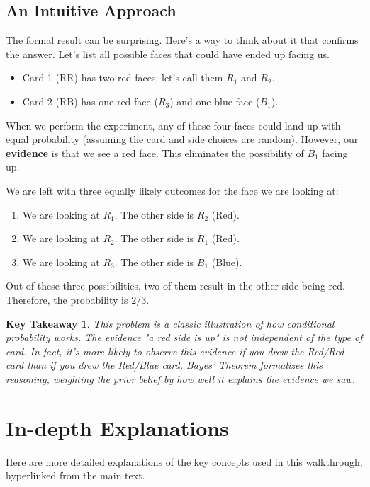 \documentclass[11pt,a4paper]{article}
\theoremstyle{tutorstyle}
\newtheorem*{takeaway}{Key Takeaway}
\begin{document}
\subsection{An Intuitive Approach}
The formal result can be surprising. Here's a way to think about it that confirms the answer. Let's list all possible faces that could have ended up facing us.
\begin{itemize}
    \item Card 1 (RR) has two red faces: let's call them $R_1$ and $R_2$.
    \item Card 2 (RB) has one red face ($R_3$) and one blue face ($B_1$).
\end{itemize}
When we perform the experiment, any of these four faces could land up with equal probability (assuming the card and side choices are random). However, our \textbf{evidence} is that we see a red face. This eliminates the possibility of $B_1$ facing up.

We are left with three equally likely outcomes for the face we are looking at:
\begin{enumerate}
    \item We are looking at $R_1$. The other side is $R_2$ (Red).
    \item We are looking at $R_2$. The other side is $R_1$ (Red).
    \item We are looking at $R_3$. The other side is $B_1$ (Blue).
\end{enumerate}
Out of these three possibilities, two of them result in the other side being red. Therefore, the probability is $2/3$.

\begin{takeaway}
This problem is a classic illustration of how conditional probability works. The evidence "a red side is up" is not independent of the type of card. In fact, it's \textit{more likely} to observe this evidence if you drew the Red/Red card than if you drew the Red/Blue card. Bayes' Theorem formalizes this reasoning, weighting the prior belief by how well it explains the evidence we saw.
\end{takeaway}

\newpage
\section{In-depth Explanations}

Here are more detailed explanations of the key concepts used in this walkthrough, hyperlinked from the main text.
\end{document}
